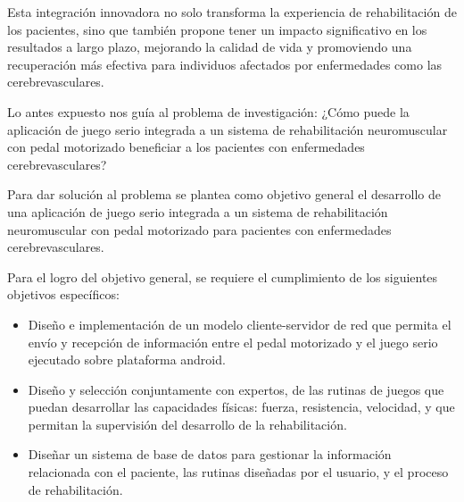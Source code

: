 \begin{introduction}
    \vspace{5pt}
    Esta integración innovadora no solo transforma la experiencia de rehabilitación de los pacientes, sino que también propone tener un impacto significativo en los resultados a largo plazo, mejorando la calidad de vida y promoviendo una recuperación más efectiva para individuos afectados por enfermedades como las cerebrevasculares.

    \vspace{5pt}
    Lo antes expuesto nos guía al problema de investigación: ¿Cómo puede la aplicación de juego serio integrada a un sistema de rehabilitación neuromuscular con pedal motorizado beneficiar a los pacientes con enfermedades cerebrevasculares?

    \vspace{5pt}
    Para dar solución al problema se plantea como objetivo general el desarrollo de una aplicación de juego serio integrada a un sistema de rehabilitación neuromuscular con pedal motorizado para pacientes con enfermedades cerebrevasculares.
    
    \vspace{5pt}
    Para el logro del objetivo general, se requiere el cumplimiento de los siguientes objetivos específicos:

    \begin{itemize}
        \item Diseño e implementación de un modelo cliente-servidor de red que permita el envío y recepción de información entre el pedal motorizado y el juego serio ejecutado sobre plataforma android.
        \item  Diseño y selección conjuntamente con expertos, de las rutinas de juegos que puedan desarrollar las capacidades físicas: fuerza, resistencia, velocidad, y que
        permitan la supervisión del desarrollo de la rehabilitación.
        \item Diseñar un sistema de base de datos para gestionar la información relacionada con el paciente, las rutinas diseñadas por el usuario, y el proceso de
        rehabilitación.
    \end{itemize}


\end{introduction}
